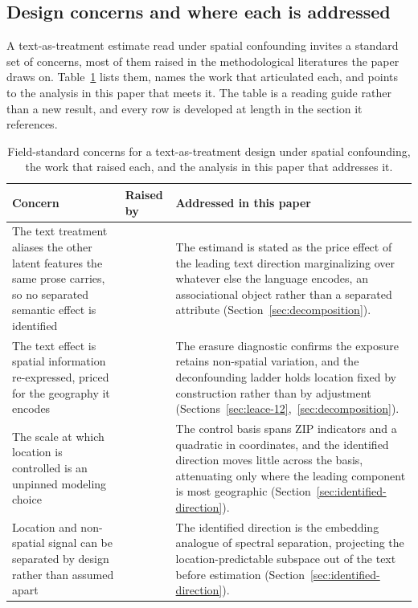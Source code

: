 \subsection{Design concerns and where each is addressed}
\label{app:concerns}

A text-as-treatment estimate read under spatial confounding invites a standard set
of concerns, most of them raised in the methodological literatures the paper draws
on. Table~\ref{tab:concerns} lists them, names the work that articulated each, and
points to the analysis in this paper that meets it. The table is a reading guide
rather than a new result, and every row is developed at length in the section it
references.

\begin{table}[H]
\centering
\caption{Field-standard concerns for a text-as-treatment design under spatial
confounding, the work that raised each, and the analysis in this paper that
addresses it.}
\label{tab:concerns}
\footnotesize
\renewcommand{\arraystretch}{1.25}
\begin{tabular}{p{}p{}p{}}
\toprule
Concern & Raised by & Addressed in this paper \\
\midrule
The text treatment aliases the other latent features the same prose carries, so no
separated semantic effect is identified &
\citet{fong2023latent} &
The estimand is stated as the price effect of the leading text direction
marginalizing over whatever else the language encodes, an associational object
rather than a separated attribute (Section~\ref{sec:decomposition}). \\

The text effect is spatial information re-expressed, priced for the geography it
encodes &
\citet{gilbert2021causal} &
The erasure diagnostic confirms the exposure retains non-spatial variation, and the
deconfounding ladder holds location fixed by construction rather than by adjustment
(Sections~\ref{sec:leace-12},~\ref{sec:decomposition}). \\

The scale at which location is controlled is an unpinned modeling choice &
\citet{keller2020selecting} &
The control basis spans ZIP indicators and a quadratic in coordinates, and the
identified direction moves little across the basis, attenuating only where the
leading component is most geographic (Section~\ref{sec:identified-direction}). \\

Location and non-spatial signal can be separated by design rather than assumed apart &
\citet{guan2023spectral} &
The identified direction is the embedding analogue of spectral separation, projecting
the location-predictable subspace out of the text before estimation
(Section~\ref{sec:identified-direction}). \\


\end{tabular}
\end{table}
